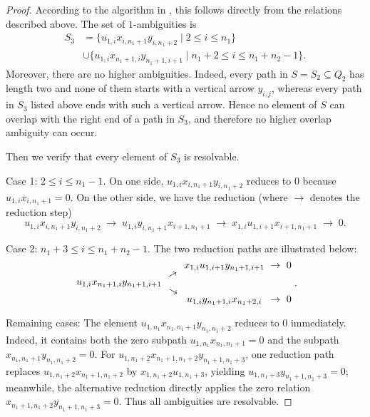 \documentclass[a4paper, reqno, 11pt]{amsart}
\theoremstyle{definition}
\begin{document}
\begin{proof}
	According to the algorithm in \cite[Heuristic 3.13]{Barmeier-Wang2020}, this follows directly from the relations described above.  
	The set of $1$-ambiguities is
	\begin{align*}
		S_3 &=\bigl\{ u_{1,i}x_{i,n_1+1}y_{i,n_1+2} \mid 2\leq i \leq n_1 \bigr\}\\
		&\cup \bigl\{  u_{1,i}x_{n_1+1,i}y_{n_1+1,i+1} \mid  n_1+2 \leq i\leq n_1+n_2-1  \bigr\}.
	\end{align*}
	Moreover, there are no higher ambiguities. Indeed, every path in \(S=S_2\subseteq Q_2\) has length two and none of them starts with a vertical arrow \(y_{i,j}\), whereas every path in \(S_3\) listed above ends with such a vertical arrow. Hence no element of \(S\) can overlap with the right end of a path in \(S_3\), and therefore no higher overlap ambiguity can occur.
	
	Then we verify that every element of $S_3$ is resolvable.
	
	Case 1: $2\leq i \le n_1-1$.  
	On one side, $u_{1,i}x_{i,n_1+1}y_{i,n_1+2}$ reduces to $0$ because $u_{1,i}x_{i,n_1+1}=0$.  
	On the other side, we have the reduction (where $\to$ denotes the reduction step)
	\[
	u_{1,i}x_{i,n_1+1}y_{i,n_1+2} \;\to\; u_{1,i}y_{i,n_1+1}x_{i+1,n_1+1} \;\to\; x_{1,i}u_{1,i+1}x_{i+1,n_1+1} \;\to\; 0.
	\]
	
	Case 2: $n_1+3 \le i \le n_1+n_2-1$.  
	The two reduction paths are illustrated below:
	\[
	\renewcommand\arraystretch{0.4}
	\setlength\arraycolsep{3pt}
	\begin{array}{c c c c c}
		& & x_{1,i}u_{1,i+1}y_{n_1+1,i+1} & \to & 0 \\
		& \rotatebox{30}{$\to$} & & & \\
		u_{1,i}x_{n_1+1,i}y_{n_1+1,i+1} & & & & \\
		& \rotatebox{-30}{$\to$} & & & \\
		& & u_{1,i}y_{n_1+1,i}x_{n_1+2,i} & \to & 0
	\end{array}.
	\]
	
	Remaining cases: The element $u_{1,n_1}x_{n_1,n_1+1}y_{n_1,n_1+2}$ reduces to $0$ immediately. Indeed, it contains both the zero subpath $u_{1,n_1}x_{n_1,n_1+1} = 0$ and the subpath $x_{n_1,n_1+1}y_{n_1,n_1+2} = 0$. For $u_{1,n_1+2}x_{n_1+1,n_1+2}y_{n_1+1,n_1+3}$, one reduction path replaces $u_{1,n_1+2}x_{n_1+1,n_1+2}$ by $x_{1,n_1+2}u_{1,n_1+3}$, yielding $u_{1,n_1+3}y_{n_1+1,n_1+3} = 0$; meanwhile, the alternative reduction directly applies the zero relation $x_{n_1+1,n_1+2}y_{n_1+1,n_1+3} = 0$. Thus all ambiguities are resolvable.
\end{proof}
\end{document}
